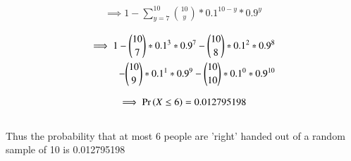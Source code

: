 \documentclass[journal,12pt,twocolumn]{IEEEtran}
\begin{document}
\begin{align}
\implies 1 - \sum_{y=7}^{10} {{10}\choose{y}} * {0.1}^{10-y} * {0.9}^{y}\label{0.0.5}
\end{align}

\begin{align}
\begin{split}
\implies 1 - {{10}\choose{7}} * {0.1}^{3} * {0.9}^{7} - {{10}\choose{8}} * {0.1}^{2} * {0.9}^{8}
\bigskip\\
-{{10}\choose{9}} * {0.1}^{1} * {0.9}^{9} - {{10}\choose{10}} * {0.1}^{0} * {0.9}^{10}\label{0.0.6}
\end{split}
\end{align}

\begin{align}
\implies \Pr\left(X \leq 6\right) = 0.012795198\notag
\end{align}
\bigskip\\
Thus the probability that at most 6 people are 'right' handed out of a random sample of 10 is 0.012795198 
\end{document}
